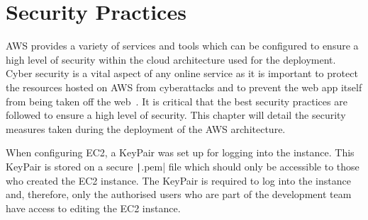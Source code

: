 \chapter{Security Practices}\label{ch:security-practices}
AWS provides a variety of services and tools which can be configured to ensure a high level of security within the
cloud architecture used for the deployment.
Cyber security is a vital aspect of any online service as it is important to protect the resources hosted on AWS from
cyberattacks and to prevent the web app itself from being taken off the web~\parencite{cavelty2010cyber}.
It is critical that the best security practices are followed to ensure a high level of security.
This chapter will detail the security measures taken during the deployment of the AWS architecture.

When configuring EC2, a KeyPair was set up for logging into the instance.
This KeyPair is stored on a secure \texttt|.pem| file which should only be accessible to those who created
the EC2 instance.
The KeyPair is required to log into the instance and, therefore, only the authorised users who are part of the
development team have access to editing the EC2 instance.

